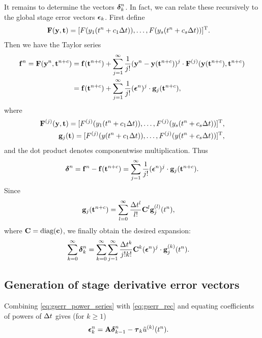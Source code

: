 It remains to determine the vectors $\boldsymbol{\delta}^n_k$. In fact, 
we can relate these recursively to the global stage error vectors $\boldsymbol{\epsilon}_k$.  First define
\begin{align*}
\mathbf{F}(\mathbf{y},\mathbf{t}) & = [F(y_1(t^n+c_1 \Delta t)),\dots,F(y_s(t^n + c_s \Delta t))]^\mathrm{T}.
\end{align*}
Then we have the Taylor series
\begin{align*}
    \mathbf{f}^n =  \mathbf{F}(\mathbf{y}^n,\mathbf{t}^{n+c}) & = \mathbf{f}(\mathbf{t}^{n+c}) + \sum_{j=1}^\infty \frac{1}{j!} (\mathbf{y}^n-\mathbf{y}(\mathbf{t}^{n+c}))^j \cdot
    \mathbf{F}^{(j)}(\mathbf{y}(\mathbf{t}^{n+c}),\mathbf{t}^{n+c}) \\
    & = \mathbf{f}(\mathbf{t}^{n+c}) + \sum_{j=1}^\infty \frac{1}{j!} (\boldsymbol{\epsilon}^n)^j \cdot \mathbf{g}_j(\mathbf{t}^{n+c}),
\end{align*}
where 
\begin{align*}
\mathbf{F}^{(j)}(\mathbf{y},\mathbf{t}) = [F^{(j)}(y_1(t^n + c_1\Delta t)),\dots,F^{(j)}(y_s(t^n + c_s \Delta t))]^\mathrm{T}, \\
\mathbf{g}_j(\mathbf{t}) = [F^{(j)}(y(t^n + c_1 \Delta t)),\dots,F^{(j)}(y(t^n + c_s \Delta t))]^\mathrm{T},
\end{align*}
and the dot product denotes componentwise multiplication. Thus
\begin{align}
  \boldsymbol{\delta}^n = \mathbf{f}^n - \mathbf{f}(\mathbf{t}^{n+c}) = \sum_{j=1}^\infty \frac{1}{j!} (\boldsymbol{\epsilon}^n)^j \cdot
          \mathbf{g}_j(\mathbf{t}^{n+c}).
\end{align}
Since
\begin{align}
    \mathbf{g}_j(\mathbf{t}^{n+c}) & = \sum_{l=0}^\infty \frac{\Delta t^l}{l!} \mathbf{C}^l \mathbf{g}_j^{(l)}(t^{n}),
\end{align}
where $\mathbf{C}=\textup{diag}(\mathbf{c})$, we finally obtain the desired expansion:
\begin{align} \label{eq:triplesum}
    \sum_{k=0}^\infty \boldsymbol{\delta}^n_k & = \sum_{k=0}^\infty \sum_{j=1}^\infty \frac{\Delta t^k}{j!k!} \mathbf{C}^k (\boldsymbol{\epsilon}^n)^j \cdot \mathbf{g}_j^{(k)}(t^{n}).
\end{align}

\subsection{Generation of stage derivative error vectors\label{recursion}}
Combining \eqref{eq:gserr_power_series} with \eqref{eq:gserr_rec} and equating
coefficients of powers of $\Delta t$ gives (for $k\ge 1$)
\begin{align} \label{eq:gserrk}
\boldsymbol{\epsilon}^n_k & = \mathbf{A} \boldsymbol{\delta}^n_{k-1} - \boldsymbol{\tau}_k \tilde{u}^{(k)}(t^n).
\end{align}

